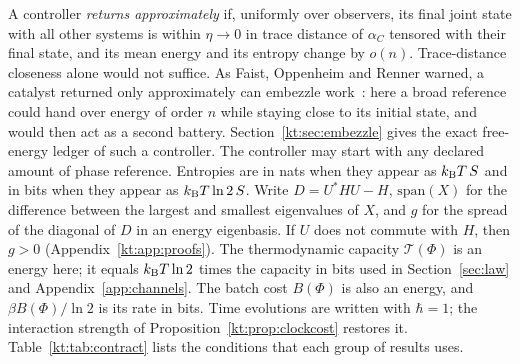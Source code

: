 A controller \emph{returns approximately} if, uniformly over observers, its final joint state with all other systems is within $\eta\to0$ in trace distance of $\alpha_C$ tensored with their final state, and its mean energy and its entropy change by $o(n)$. Trace-distance closeness alone would not suffice. As Faist, Oppenheim and Renner warned, a catalyst returned only approximately can embezzle work~\cite{FOR15}: here a broad reference could hand over energy of order $n$ while staying close to its initial state, and would then act as a second battery. Section~\ref{kt:sec:embezzle} gives the exact free-energy ledger of such a controller. The controller may start with any declared amount of phase reference. Entropies are in nats when they appear as $k_{\mathrm B} T\,S$ and in bits when they appear as $k_{\mathrm B} T\ln2\,S$. Write $D=U^*HU-H$, $\mathrm{span}(X)$ for the difference between the largest and smallest eigenvalues of $X$, and $g$ for the spread of the diagonal of $D$ in an energy eigenbasis. If $U$ does not commute with $H$, then $g>0$ (Appendix~\ref{kt:app:proofs}). The thermodynamic capacity $\mathcal T(\Phi)$ is an energy here; it equals $k_{\mathrm B} T\ln2$ times the capacity in bits used in Section~\ref{sec:law} and Appendix~\ref{app:channels}. The batch cost $B(\Phi)$ is also an energy, and $\beta B(\Phi)/\ln2$ is its rate in bits. Time evolutions are written with $\hbar=1$; the interaction strength of Proposition~\ref{kt:prop:clockcost} restores it. Table~\ref{kt:tab:contract} lists the conditions that each group of results uses.

